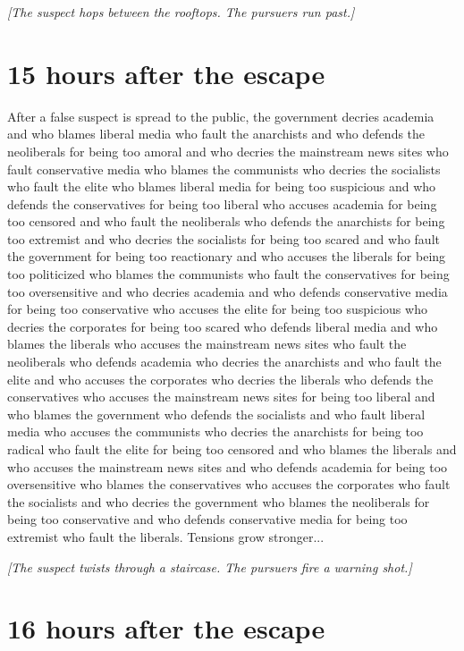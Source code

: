\documentclass{report}
\begin{document}
\textit{[The suspect hops between the rooftops. The pursuers run past.]}


\section*{15 \small{hours after the escape}}

After a false suspect is spread to the public, the government decries academia and who blames liberal media who fault the anarchists and who defends the neoliberals for being too amoral and who decries the mainstream news sites who fault conservative media who blames the communists who decries the socialists who fault the elite who blames liberal media for being too suspicious and who defends the conservatives for being too liberal who accuses academia for being too censored and who fault the neoliberals who defends the anarchists for being too extremist and who decries the socialists for being too scared and who fault the government for being too reactionary and who accuses the liberals for being too politicized who blames the communists who fault the conservatives for being too oversensitive and who decries academia and who defends conservative media for being too conservative who accuses the elite for being too suspicious who decries the corporates for being too scared who defends liberal media and who blames the liberals who accuses the mainstream news sites who fault the neoliberals who defends academia who decries the anarchists and who fault the elite and who accuses the corporates who decries the liberals who defends the conservatives who accuses the mainstream news sites for being too liberal and who blames the government who defends the socialists and who fault liberal media who accuses the communists who decries the anarchists for being too radical who fault the elite for being too censored and who blames the liberals and who accuses the mainstream news sites and who defends academia for being too oversensitive who blames the conservatives who accuses the corporates who fault the socialists and who decries the government who blames the neoliberals for being too conservative and who defends conservative media for being too extremist who fault the liberals. Tensions grow stronger...

\textit{[The suspect twists through a staircase. The pursuers fire a warning shot.]}


\section*{16 \small{hours after the escape}}
\end{document}
